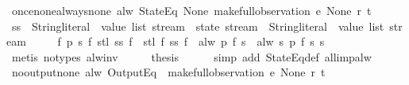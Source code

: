 \begin{isabellebody}
%
\isadelimproof
\isanewline
%
\endisadelimproof
\isanewline
{}\isamarkupfalse%
\ once{\isacharunderscore}none{\isacharunderscore}always{\isacharunderscore}none{\isacharcolon}\ {\isachardoublequoteopen}alw\ {\isacharparenleft}StateEq\ None{\isacharparenright}\ {\isacharparenleft}make{\isacharunderscore}full{\isacharunderscore}observation\ e\ None\ r\ t{\isacharparenright}{\isachardoublequoteclose}\isanewline
%
\isadelimproof
%
\endisadelimproof
%
\isatagproof
{}\isamarkupfalse%
\ {\isacharminus}\isanewline
\ \ \isamarkupfalse%
\ ss\ {\isacharcolon}{\isacharcolon}\ {\isachardoublequoteopen}{\isacharparenleft}{\isacharparenleft}String{\isachardot}literal\ {\isasymtimes}\ value\ list{\isacharparenright}\ stream\ {\isasymRightarrow}\ state\ stream{\isacharparenright}\ {\isasymRightarrow}\ {\isacharparenleft}String{\isachardot}literal\ {\isasymtimes}\ value\ list{\isacharparenright}\ stream{\isachardoublequoteclose}\ \isanewline
\ \ \ \ {\isachardoublequoteopen}{\isasymforall}f\ p\ s{\isachardot}\ f\ {\isacharparenleft}stl\ {\isacharparenleft}ss\ f{\isacharparenright}{\isacharparenright}\ {\isasymnoteq}\ stl\ {\isacharparenleft}f\ {\isacharparenleft}ss\ f{\isacharparenright}{\isacharparenright}\ {\isasymor}\ alw\ p\ {\isacharparenleft}f\ s{\isacharparenright}\ {\isacharequal}\ alw\ {\isacharparenleft}{\isasymlambda}s{\isachardot}\ p\ {\isacharparenleft}f\ s{\isacharparenright}{\isacharparenright}\ s{\isachardoublequoteclose}\isanewline
\ \ \ \ \isamarkupfalse%
\ {\isacharparenleft}metis\ {\isacharparenleft}no{\isacharunderscore}types{\isacharparenright}\ alw{\isacharunderscore}inv{\isacharparenright}\isanewline
\ \ \isamarkupfalse%
\ \isamarkupfalse%
\ {\isacharquery}thesis\isanewline
\ \ \ \ \isamarkupfalse%
\ {\isacharparenleft}simp\ add{\isacharcolon}\ StateEq{\isacharunderscore}def\ all{\isacharunderscore}imp{\isacharunderscore}alw{\isacharparenright}\isanewline
{}\isamarkupfalse%
%
\endisatagproof
{\isafoldproof}%
%
\isadelimproof
\isanewline
%
\endisadelimproof
\isanewline
{}\isamarkupfalse%
\ no{\isacharunderscore}output{\isacharunderscore}none{\isacharcolon}\ {\isachardoublequoteopen}alw\ {\isacharparenleft}OutputEq\ {\isacharbrackleft}{\isacharbrackright}{\isacharparenright}\ {\isacharparenleft}make{\isacharunderscore}full{\isacharunderscore}observation\ e\ None\ r\ t{\isacharparenright}{\isachardoublequoteclose}\isanewline
%
\isadelimproof
%
\endisadelimproof
%
\isatagproof
{}\isamarkupfalse%

\end{isabellebody}
